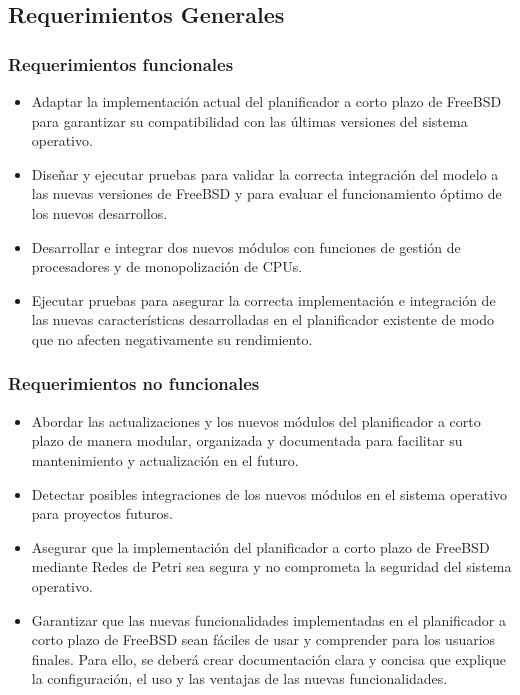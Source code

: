 \subsection{Requerimientos Generales}

\subsubsection{Requerimientos funcionales}
\begin{itemize}
    \item Adaptar la implementación actual del planificador a corto plazo de FreeBSD para garantizar su compatibilidad con las últimas versiones del sistema operativo.
    \item Diseñar y ejecutar pruebas para validar la correcta integración del modelo a las nuevas versiones de FreeBSD y para evaluar el funcionamiento óptimo de los nuevos desarrollos.
    \item Desarrollar e integrar dos nuevos módulos con funciones de gestión de procesadores y de monopolización de CPUs.
    \item Ejecutar pruebas para asegurar la correcta implementación e integración de las nuevas características desarrolladas en el planificador existente de modo que no afecten negativamente su rendimiento.
\end{itemize}

\subsubsection{Requerimientos no funcionales}
\begin{itemize}
    \item Abordar las actualizaciones y los nuevos módulos del planificador a corto plazo de manera modular, organizada y documentada para facilitar su mantenimiento y actualización en el futuro.
    \item Detectar posibles integraciones de los nuevos módulos en el sistema operativo para proyectos futuros.
    \item Asegurar que la implementación del planificador a corto plazo de FreeBSD mediante Redes de Petri sea segura y no comprometa la seguridad del sistema operativo.
    \item Garantizar que las nuevas funcionalidades implementadas en el planificador a corto plazo de FreeBSD sean fáciles de usar y comprender para los usuarios finales. Para ello, se deberá crear documentación clara y concisa que explique la configuración, el uso y las ventajas de las nuevas funcionalidades.
\end{itemize}
